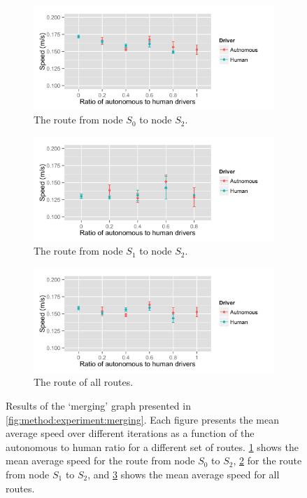 \begin{figure}
	\centering
	\begin{subfigure}{\textwidth}
		\centering
		\includegraphics[width=\textwidth]{./img/merging_03}
		\caption{The route from node $S_0$ to node $S_2$.}
		\label{fig:results:merging:03}
	\end{subfigure}
	\begin{subfigure}{\textwidth}
		\centering
		\includegraphics[width=\textwidth]{./img/merging_13}
		\caption{The route from node $S_1$ to node $S_2$.}
		\label{fig:results:merging:13}
	\end{subfigure}	
	\begin{subfigure}{\textwidth}
		\centering
		\includegraphics[width=\textwidth]{./img/merging}
		\caption{The route of all routes.}
		\label{fig:results:merging:all}
	\end{subfigure}		
	\caption{Results of the `merging' graph presented in \cref{fig:method:experiment:merging}. Each figure presents the mean average speed over different iterations as a function of the autonomous to human ratio for a different set of routes. \ref{fig:results:merging:03} shows the mean average speed for the route from node $S_0$ to $S_2$, \ref{fig:results:merging:13} for the route from node $S_1$ to $S_2$, and \ref{fig:results:merging:all} shows the mean average speed for all routes.}
	\label{fig:results:merging}
\end{figure}


